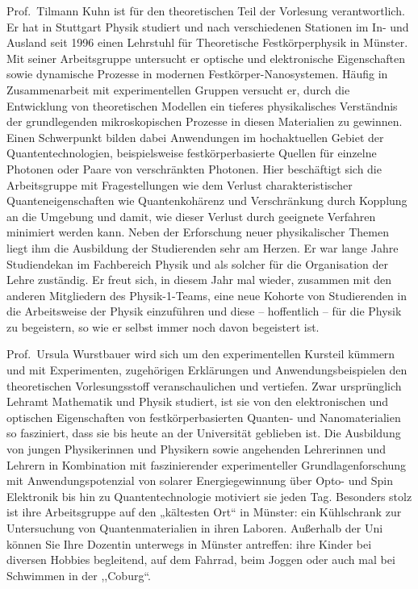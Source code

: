 \begin{multicols}{2}
Prof.\ Tilmann Kuhn ist für den theoretischen Teil der Vorlesung verantwortlich. Er hat in Stuttgart 
Physik studiert und nach verschiedenen Stationen im In- und Ausland seit 1996 einen Lehrstuhl für 
Theoretische Festkörperphysik in Münster. Mit seiner Arbeitsgruppe untersucht er optische und 
elektronische Eigenschaften sowie dynamische Prozesse in modernen Festkörper-Nanosystemen. 
Häufig in Zusammenarbeit mit experimentellen Gruppen versucht er, durch die Entwicklung von 
theoretischen Modellen ein tieferes physikalisches Verständnis der grundlegenden mikroskopischen 
Prozesse in diesen Materialien zu gewinnen. Einen Schwerpunkt bilden dabei Anwendungen im 
hochaktuellen Gebiet der Quantentechnologien, beispielsweise festkörperbasierte Quellen für 
einzelne Photonen oder Paare von verschränkten Photonen. Hier beschäftigt sich die Arbeitsgruppe 
mit Fragestellungen wie dem Verlust charakteristischer Quanteneigenschaften wie Quantenkohärenz 
und Verschränkung durch Kopplung an die Umgebung und damit, wie dieser Verlust durch geeignete 
Verfahren minimiert werden kann. Neben der Erforschung neuer physikalischer Themen liegt ihm die 
Ausbildung der Studierenden sehr am Herzen. Er war lange Jahre Studiendekan im Fachbereich Physik 
und als solcher für die Organisation der Lehre zuständig. Er freut sich, in diesem Jahr mal wieder, 
zusammen mit den anderen Mitgliedern des Physik-1-Teams, eine neue Kohorte von Studierenden in 
die Arbeitsweise der Physik einzuführen und diese – hoffentlich – für die Physik zu begeistern, so wie 
er selbst immer noch davon begeistert ist. 

Prof.\ Ursula Wurstbauer wird sich um den experimentellen Kursteil kümmern und mit Experimenten, 
zugehörigen Erklärungen und Anwendungsbeispielen den theoretischen Vorlesungsstoff 
veranschaulichen und vertiefen. Zwar ursprünglich Lehramt Mathematik und Physik studiert, ist sie 
von den elektronischen und optischen Eigenschaften von festkörperbasierten Quanten- und 
Nanomaterialien so fasziniert, dass sie bis heute an der Universität geblieben ist. Die Ausbildung von 
jungen Physikerinnen und Physikern sowie angehenden Lehrerinnen und Lehrern in Kombination mit 
faszinierender experimenteller Grundlagenforschung mit Anwendungspotenzial von solarer 
Energiegewinnung über Opto- und Spin Elektronik bis hin zu Quantentechnologie motiviert sie jeden 
Tag. Besonders stolz ist ihre Arbeitsgruppe auf den „kältesten Ort“ in Münster: ein Kühlschrank zur 
Untersuchung von Quantenmaterialien in ihren Laboren. Außerhalb der Uni können Sie Ihre Dozentin 
unterwegs in Münster antreffen: ihre Kinder bei diversen Hobbies begleitend, auf dem Fahrrad, beim 
Joggen oder auch mal bei Schwimmen in der ,,Coburg“. 


\end{multicols}
